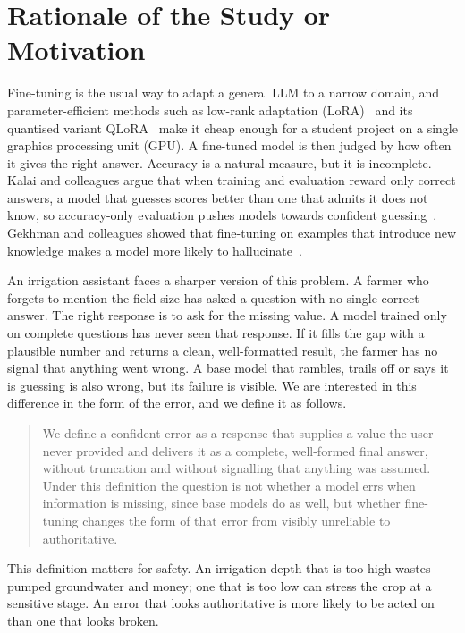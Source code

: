 \section{Rationale of the Study or Motivation}
\label{sec:motivation}

Fine-tuning is the usual way to adapt a general LLM to a narrow domain, and parameter-efficient methods such as low-rank adaptation (LoRA)~\cite{hu2022lora} and its quantised variant QLoRA~\cite{dettmers2023qlora} make it cheap enough for a student project on a single graphics processing unit (GPU). A fine-tuned model is then judged by how often it gives the right answer. Accuracy is a natural measure, but it is incomplete. Kalai and colleagues argue that when training and evaluation reward only correct answers, a model that guesses scores better than one that admits it does not know, so accuracy-only evaluation pushes models towards confident guessing~\cite{kalai2025why}. Gekhman and colleagues showed that fine-tuning on examples that introduce new knowledge makes a model more likely to hallucinate~\cite{gekhman2024finetuning}.

An irrigation assistant faces a sharper version of this problem. A farmer who forgets to mention the field size has asked a question with no single correct answer. The right response is to ask for the missing value. A model trained only on complete questions has never seen that response. If it fills the gap with a plausible number and returns a clean, well-formatted result, the farmer has no signal that anything went wrong. A base model that rambles, trails off or says it is guessing is also wrong, but its failure is visible. We are interested in this difference in the form of the error, and we define it as follows.

\begin{quote}
We define a confident error as a response that supplies a value the user never provided and delivers it as a complete, well-formed final answer, without truncation and without signalling that anything was assumed. Under this definition the question is not whether a model errs when information is missing, since base models do as well, but whether fine-tuning changes the form of that error from visibly unreliable to authoritative.
\end{quote}

This definition matters for safety. An irrigation depth that is too high wastes pumped groundwater and money; one that is too low can stress the crop at a sensitive stage. An error that looks authoritative is more likely to be acted on than one that looks broken.

